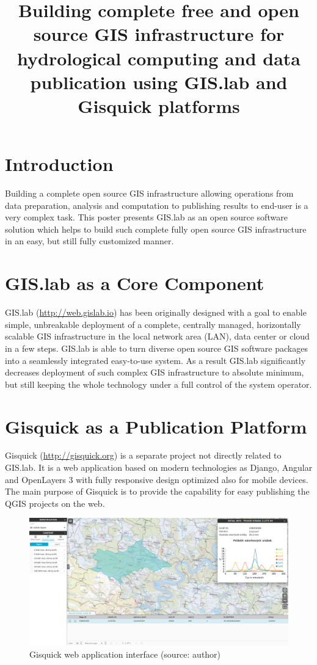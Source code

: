 \documentclass{tudelftposter}
\title{Building complete free and open source GIS infrastructure for
  hydrological computing and data publication using GIS.lab and
  Gisquick platforms}
\begin{document}
\section{Introduction}

Building a complete open source GIS infrastructure allowing operations
from data preparation, analysis and computation to publishing results
to end-user is a very complex task. This poster presents GIS.lab as an
open source software solution which helps to build such complete fully
open source GIS infrastructure in an easy, but still fully customized
manner.

\section{GIS.lab as a Core Component}

GIS.lab (\url{http://web.gislab.io}) has been originally designed with
a goal to enable simple, unbreakable deployment of a complete,
centrally managed, horizontally scalable GIS infrastructure in the
local network area (LAN), data center or cloud in a few steps. GIS.lab
is able to turn diverse open source GIS software packages into a
seamlessly integrated easy-to-use system. As a result GIS.lab
significantly decreases deployment of such complex GIS infrastructure
to absolute minimum, but still keeping the whole technology under a
full control of the system operator. 

\section{Gisquick as a Publication Platform}

Gisquick (\url{http://gisquick.org}) is a separate project not
directly related to GIS.lab. It is a web application based on modern
technologies as Django, Angular and OpenLayers 3 with fully responsive
design optimized also for mobile devices. The main purpose of Gisquick
is to provide the capability for easy publishing the QGIS projects on
the web. 

\begin{figure}[ht!]
\begin{center}
  \includegraphics[width=0.9\columnwidth]{gisquick-example.png}
  \caption{Gisquick web application interface
    (source: author)}
\label{fig:gislab_infrastructure}
\end{center}
\end{figure}
\end{document}
